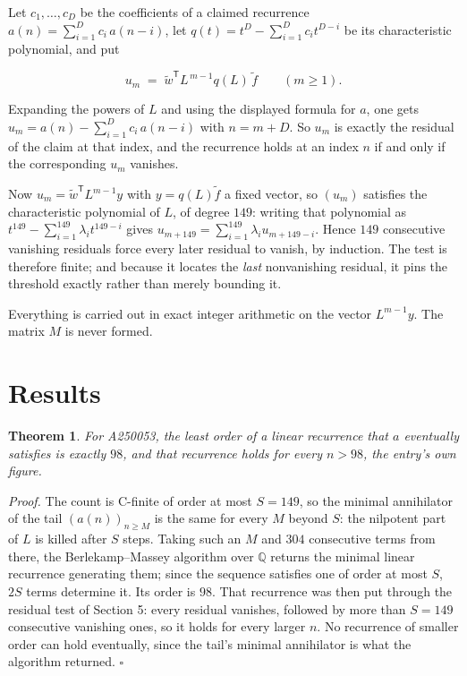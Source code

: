 \documentclass[11pt]{article}
\newtheorem{theorem}{Theorem}
\theoremstyle{definition}
\begin{document}
Let $c_1,\dots,c_D$ be the coefficients of a claimed recurrence $a(n) = \sum_{i=1}^{D} c_i\,a(n-i)$, let $q(t) = t^{D} - \sum_{i=1}^{D} c_i t^{D-i}$ be its characteristic polynomial, and put

\[u_m \;=\; \tilde w^{\mathsf T} L^{\,m-1} q(L)\,\tilde f \qquad (m \ge 1).\]

Expanding the powers of $L$ and using the displayed formula for $a$, one gets $u_m = a(n) - \sum_{i=1}^{D} c_i\,a(n-i)$ with $n = m + D$. So $u_m$ is exactly the residual of the claim at that index, and the recurrence holds at an index $n$ if and only if the corresponding $u_m$ vanishes.

Now $u_m = \tilde w^{\mathsf T} L^{m-1} y$ with $y = q(L)\tilde f$ a fixed vector, so $(u_m)$ satisfies the characteristic polynomial of $L$, of degree $149$: writing that polynomial as $t^{149} - \sum_{i=1}^{149} \lambda_i t^{149-i}$ gives $u_{m+149} = \sum_{i=1}^{149} \lambda_i u_{m+149-i}$. Hence $149$ consecutive vanishing residuals force every later residual to vanish, by induction. The test is therefore finite; and because it locates the {\itshape last} nonvanishing residual, it pins the threshold exactly rather than merely bounding it.

Everything is carried out in exact integer arithmetic on the vector $L^{m-1}y$. The matrix $M$ is never formed.

\section{Results}

\begin{theorem} For A250053, the least order of a linear recurrence that $a$ eventually satisfies is exactly $98$, and that recurrence holds for every $n > 98$, the entry's own figure.\end{theorem}

{\itshape Proof.} The count is C-finite of order at most $S = 149$, so the minimal annihilator of the tail $(a(n))_{n \ge M}$ is the same for every $M$ beyond $S$: the nilpotent part of $L$ is killed after $S$ steps. Taking such an $M$ and $304$ consecutive terms from there, the Berlekamp--Massey algorithm over $\mathbb{Q}$ returns the minimal linear recurrence generating them; since the sequence satisfies one of order at most $S$, $2S$ terms determine it. Its order is $98$. That recurrence was then put through the residual test of Section 5: every residual vanishes, followed by more than $S = 149$ consecutive vanishing ones, so it holds for every larger $n$. No recurrence of smaller order can hold eventually, since the tail's minimal annihilator is what the algorithm returned. $\square$
\end{document}
